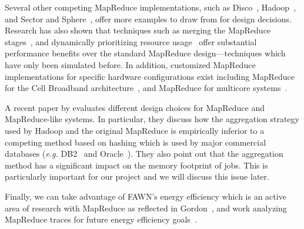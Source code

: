 \documentclass[10pt,letter,final,article,twocolumn]{article} %
\begin{document}
Several other competing MapReduce implementations, such as
Disco~\citep{disco10}, Hadoop~\citep{hadoop10}, and Sector and
Sphere~\citep{sphere09}, offer more examples to draw from for design
decisions.  Research has also shown that techniques such as merging the
MapReduce stages~\citep{barrier10}, and dynamically prioritizing resource
usage~\citep{sandholm09} offer substantial performance benefits over the
standard MapReduce design---techniques which have only been simulated
before.  In addition, customized MapReduce implementations for specific 
hardware configurations exist including MapReduce for the Cell Broadband
architecture~\citep{rafique09}, and MapReduce for multicore 
systems~\citep{chu06}.

A recent paper by \citet{yu2009distributed} evaluates different design
choices for MapReduce and MapReduce-like systems. In particular, they
discuss how the aggregation strategy used by Hadoop and the original
MapReduce is empirically inferior to a competing method based
on hashing which is used by major commercial databases (\emph{e.g.}
DB2~\citep{db210} and Oracle~\citep{oracle10}). They also point out
that the aggregation method has a significant impact on the memory
footprint of jobs. This is particularly important for our project and we will
discuss this issue later.

Finally, we can take advantage of FAWN's energy efficiency which is
an active area of research with MapReduce as reflected in
Gordon~\citep{gordon09},  and work analyzing MapReduce traces for future
energy efficiency goals~\citep{chen10}.
\end{document}
